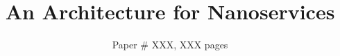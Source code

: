 \documentclass[sigconf,10pt,preprint,balance]{acmart}
\begin{document}
\title{An Architecture for Nanoservices}

\author{Paper \# XXX, XXX pages}

\renewcommand{\shortauthors}{X et al.}









\maketitle










\label{lastpage}

{\footnotesize 


}

\label{totalpage}
\end{document}

